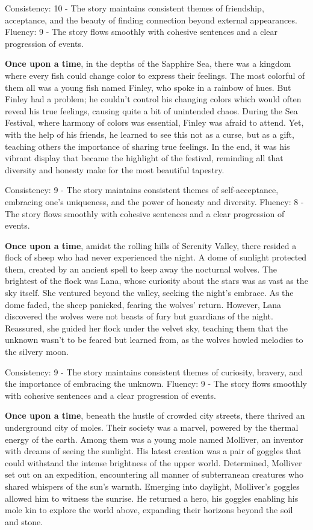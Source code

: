 \documentclass{article}
\begin{document}
Consistency: 10 - The story maintains consistent themes of friendship, acceptance, and the beauty of finding connection beyond external appearances.
Fluency: 9 - The story flows smoothly with cohesive sentences and a clear progression of events.

\textbf{Once upon a time}, in the depths of the Sapphire Sea, there was a kingdom where every fish could change color to express their feelings. The most colorful of them all was a young fish named Finley, who spoke in a rainbow of hues. But Finley had a problem; he couldn't control his changing colors which would often reveal his true feelings, causing quite a bit of unintended chaos. During the Sea Festival, where harmony of colors was essential, Finley was afraid to attend. Yet, with the help of his friends, he learned to see this not as a curse, but as a gift, teaching others the importance of sharing true feelings. In the end, it was his vibrant display that became the highlight of the festival, reminding all that diversity and honesty make for the most beautiful tapestry.

Consistency: 9 - The story maintains consistent themes of self-acceptance, embracing one's uniqueness, and the power of honesty and diversity.
Fluency: 8 - The story flows smoothly with cohesive sentences and a clear progression of events.

\textbf{Once upon a time}, amidst the rolling hills of Serenity Valley, there resided a flock of sheep who had never experienced the night. A dome of sunlight protected them, created by an ancient spell to keep away the nocturnal wolves. The brightest of the flock was Lana, whose curiosity about the stars was as vast as the sky itself. She ventured beyond the valley, seeking the night's embrace. As the dome faded, the sheep panicked, fearing the wolves' return. However, Lana discovered the wolves were not beasts of fury but guardians of the night. Reassured, she guided her flock under the velvet sky, teaching them that the unknown wasn't to be feared but learned from, as the wolves howled melodies to the silvery moon.

Consistency: 9 - The story maintains consistent themes of curiosity, bravery, and the importance of embracing the unknown.
Fluency: 9 - The story flows smoothly with cohesive sentences and a clear progression of events.

\textbf{Once upon a time}, beneath the hustle of crowded city streets, there thrived an underground city of moles. Their society was a marvel, powered by the thermal energy of the earth. Among them was a young mole named Molliver, an inventor with dreams of seeing the sunlight. His latest creation was a pair of goggles that could withstand the intense brightness of the upper world. Determined, Molliver set out on an expedition, encountering all manner of subterranean creatures who shared whispers of the sun's warmth. Emerging into daylight, Molliver's goggles allowed him to witness the sunrise. He returned a hero, his goggles enabling his mole kin to explore the world above, expanding their horizons beyond the soil and stone.
\end{document}
